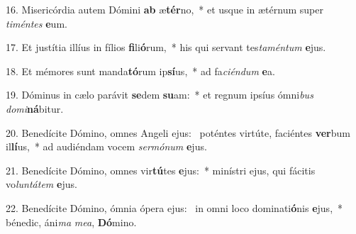 16. Misericórdia autem Dómini \textbf{ab} æ\textbf{tér}no,~*  et usque in ætérnum super \textit{ti}\textit{mén}\textit{tes} \textbf{e}um.\

17. Et justítia illíus in fílios \textbf{fi}li\textbf{ó}rum,~*  his qui servant tes\textit{ta}\textit{mén}\textit{tum} \textbf{e}jus.\

18. Et mémores sunt manda\textbf{tó}rum ip\textbf{sí}us,~*  ad fa\textit{ci}\textit{én}\textit{dum} \textbf{e}a.\

19. Dóminus in cælo parávit \textbf{se}dem \textbf{su}am:~*  et regnum ipsíus ómni\textit{bus} \textit{do}\textit{mi}\textbf{ná}bitur.\

20. Benedícite Dómino, omnes Angeli ejus: \dag\  poténtes virtúte, faciéntes \textbf{ver}bum il\textbf{lí}us,~*  ad audiéndam vocem \textit{ser}\textit{mó}\textit{num} \textbf{e}jus.\

21. Benedícite Dómino, omnes vir\textbf{tú}tes \textbf{e}jus:~*  minístri ejus, qui fácitis vo\textit{lun}\textit{tá}\textit{tem} \textbf{e}jus.\

22. Benedícite Dómino, ómnia ópera ejus: \dag\  in omni loco dominati\textbf{ó}nis \textbf{e}jus,~*  bénedic, áni\textit{ma} \textit{me}\textit{a}, \textbf{Dó}mino.\

